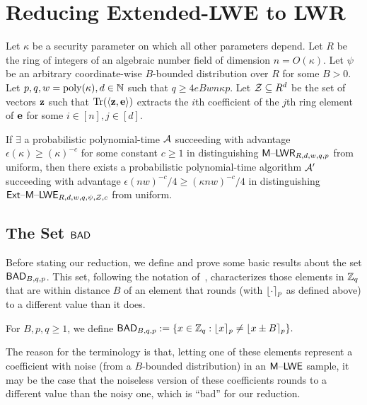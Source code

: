 \section{Reducing Extended-LWE to LWR}
\label{sec:redlwelwr}
\begin{theorem}\label{thm:extlwe-lwr}Let $\kappa$ be a security parameter on which all other parameters depend. Let $R$ be the ring of integers of an algebraic
  number field of dimension $n=O(\kappa)$. Let $\psi$ be an arbitrary
  coordinate-wise $B$-bounded distribution over $R$ for some $B
  >0$. Let $p, q, w=\operatorname{poly}(\kappa),d  \in \mathbb{N}$ such that $q \geq
  4eBwn\kappa p$. Let $\mathcal{Z} \subseteq R^d$ be the set of vectors
  $\mathbf{z}$ such that $\operatorname{Tr}(\langle\mathbf{z},\mathbf{e}\rangle)$ extracts the $i$th
  coefficient of the $j$th ring element of $\mathbf{e}$ for some $i \in
  [n], j \in [d]$.

If $\exists$ a probabilistic polynomial-time $\mathcal{A}$ succeeding with
advantage $\epsilon(\kappa) \geq (\kappa)^{-c}$ for some constant $c \geq 1$
 in distinguishing $\mathsf{M \text{\textendash} LWR}_{R,d,w,q,p}$ from
uniform, then there exists a probabilistic polynomial-time algorithm
$\mathcal{A}'$ succeeding with  advantage $\epsilon(nw)^{-c}/4 \geq (\kappa n
w)^{-c}/4$ in distinguishing
$\mathsf{Ext \text{\textendash} M \text{\textendash} LWE}_{R,d,w,q,\psi,\mathcal{Z},c}$ from uniform. 
\end{theorem}




\subsection{The Set $\textsf{BAD}$}
\label{sec:defs-lemmas}
Before stating our reduction, we define and prove some basic results
about the set $\textsf{BAD}_{B,q,p}$. This set, following the
notation of~\cite{DBLP:conf/eurocrypt/BanerjeePR12}, characterizes
those elements in $\mathbb{Z}_q$ that are within distance $B$ of an element
that rounds (with $\lfloor\cdot\rceil_p$ as defined above) to a different
value than it does.

\begin{definition}\label{def:setbad} For  $B, p, q \geq 1$, we define $\textsf{BAD}_{B,q,p} := \{x \in \mathbb{Z}_q: \lfloor x\rceil_p \neq \lfloor x\pm
  B\rceil_p\}.$
\end{definition}

The reason for the terminology is that, letting one of these elements
represent a coefficient with noise (from a $B$-bounded distribution)
in an $\mathsf{M \text{\textendash} LWE}$ sample, it may be the case that the noiseless version of
these coefficients rounds to a different value than the noisy one,
which is ``bad'' for our reduction.

